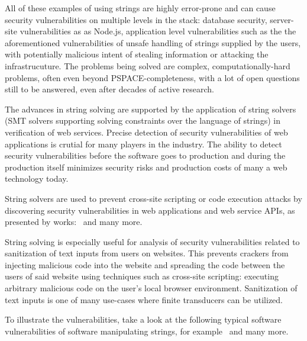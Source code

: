 All of these examples of using strings are highly error-prone and can cause security vulnerabilities on multiple levels in the stack: database security, server-site vulnerabilities as as Node.js, application level vulnerabilities such as the the aforementioned vulnerabilities of unsafe handling of strings supplied by the users, with potentially malicious intent of stealing information or attacking the infrastrucuture.
The problems being solved are complex, computationally-hard problems, often even beyond PSPACE-completeness, with a lot of open questions still to be answered, even after decades of active research.

The advances in string solving are supported by the application of string solvers (SMT solvers supporting solving constraints over the language of strings) in verification of web services.
Precise detection of security vulnerabilities of web applications is crutial for many players in the industry.
The ability to detect security vulnerabilities before the software goes to production and during the production itself minimizes security risks and production costs of many a web technology today.

String solvers are used to prevent cross-site scripting or code execution attacks by discovering security vulnerabilities in web applications and web service APIs, as presented by works:~\cite{String_constraints_with_concatenation_and_transducers_solved_efficiently, Composing_Static_and_Dynamic_Analysis_to_Validate_Sanitization_in_Web_Applications, Satisfiability_Modulo_Theories_Introduction_and_Applications, Simple_linear_string_constraints,Z3-str_a_z3-based_string_solver_for_web_application_analysis,S3_A_Symbolic_String_Solver_for_Vulnerability_Detection_in_Web_Applications} and many more.

String solving is especially useful for analysis of security vulnerabilities related to sanitization of text inputs from users on websites.
This prevents crackers from injecting malicious code into the website and spreading the code between the users of said website using techniques such as cross-site scripting: executing arbitrary malicious code on the user's local browser environment.
Sanitization of text inputs is one of many use-cases where finite transducers can be utilized.

To illustrate the vulnerabilities, take a look at the following typical software vulnerabilities of software manipulating strings, for example~\cite{replace_nfts_model_ModelingRegularReplacementForStringConstraintSolving_DBLP:conf/nfm/FuL10,kern14} and many more.

